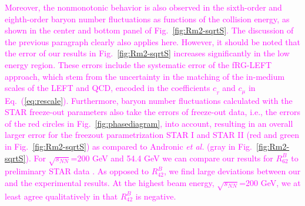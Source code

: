 \documentclass[%
reprint,
superscriptaddress,
showpacs,preprintnumbers,
 amsmath,amssymb,
 aps,
prd,
]{revtex4-1}
\def\Fig#1{Fig.~\ref{#1}} \def\Tab#1{Tab.~\ref{#1}}
\def\Eq#1{Eq.~(\ref{#1})}
\newcommand{\colfab}[1]{\textcolor{magenta}{#1}}
\begin{document}
\colfab{
Moreover, the nonmonotonic behavior is also observed in the sixth-order and eighth-order baryon number fluctuations as functions of the collision energy, as shown in the center and bottom panel of \Fig{fig:Rm2-sqrtS}. 
\colfab{The discussion of the previous paragraph clearly also applies here.}
However, it should be noted that the error of our results in \Fig{fig:Rm2-sqrtS} increases significantly in the low energy region. These errors include the systematic error of the fRG-LEFT approach, which stem from the uncertainty in the matching of the in-medium scales of the LEFT and QCD, encoded in the coefficients $c_{_{T}}$ and $c_{\mu}$ in \Eq{eq:rescale}. Furthermore, baryon number fluctuations calculated with the STAR freeze-out parameters also take the errors of freeze-out data, i.e., the errors of the red circles in \Fig{fig:phasediagram}, into account, resulting in an overall larger error for the freezout parametrization STAR I and STAR II (red and green in \Fig{fig:Rm2-sqrtS}) as compared to Andronic {\it et al.} (gray in \Fig{fig:Rm2-sqrtS}). For $\sqrt{s_{NN}}$=200 GeV and 54.4 GeV we can compare our results for $R^{B}_{62}$ to preliminary STAR data \cite{Nonaka:2020crv,Pandav:2020uzx}. As opposed to $R^{B}_{42}$, we find large deviations between our and the experimental results. At the highest beam energy, $\sqrt{s_{NN}}$=200 GeV, we at least agree qualitatively in that $R^{B}_{42}$ is negative.
}



 

\end{document}
